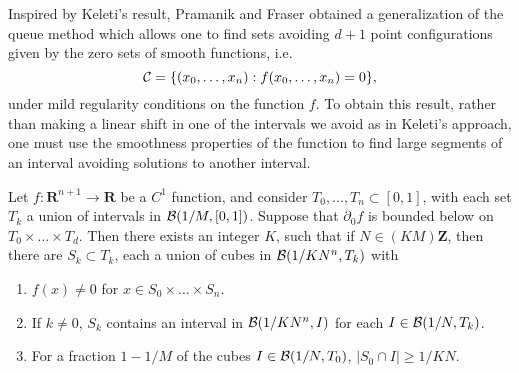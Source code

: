 Inspired by Keleti's result, Pramanik and Fraser obtained a generalization of the queue method which allows one to find sets avoiding $d+1$ point configurations given by the zero sets of smooth functions, i.e.
%
\[ \operatorname{\mathcal{C}} = \{ (x_0, \dots, x_n) : f(x_0, \dots, x_n) = 0 \}, \]
%
under mild regularity conditions on the function $f$. To obtain this result, rather than making a linear shift in one of the intervals we avoid as in Keleti's approach, one must use the smoothness properties of the function to find large segments of an interval avoiding solutions to another interval.

\begin{theorem} \label{pramanikfraserbuildingblock}
    Let $f: \mathbf{R}^{n+1} \to \mathbf{R}$ be a $C^1$ function, and consider $T_0, \dots, T_n \subset [0,1]$, with each set $T_k$ a union of intervals in $\operatorname{\mathcal{B}}(1/M,[0,1])$. Suppose that $\partial_0 f$ is bounded below on $T_0 \times \dots \times T_d$. Then there exists an integer $K$, such that if  $N \in (KM) \mathbf{Z}$, then there are $S_k \subset T_k$, each a union of cubes in $\operatorname{\mathcal{B}}(1/KN^n,T_k)$ with
    \begin{enumerate}
        \item \label{avoidanceProperty} $f(x) \neq 0$ for $x \in S_0 \times \dots \times S_n$.

        \item \label{constantSelection} If $k \neq 0$, $S_k$ contains an interval in $\operatorname{\mathcal{B}}(1/KN^n,I)$ for each $I \in \operatorname{\mathcal{B}}(1/N,T_k)$.

        \item \label{minkowskiOneProperty} For a fraction $1 - 1/M$ of the cubes $I \in \operatorname{\mathcal{B}}(1/N,T_0)$, $|S_0 \cap I| \geq 1/KN$.
    \end{enumerate}
\end{theorem}

